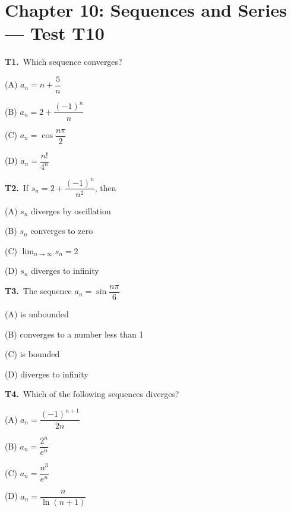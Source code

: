 \documentclass[11pt]{article}
\begin{document}
\section*{Chapter 10: Sequences and Series --- Test T10}

\bigskip\noindent\textbf{T1.}\ Which sequence converges?
\begin{list}{}{\setlength{\leftmargin}{3em}\setlength{\labelwidth}{2.5em}\setlength{\itemsep}{0pt}\setlength{\topsep}{2pt}}
\item[(A)] $a_n = n+\dfrac{5}{n}$
\item[(B)] $a_n = 2+\dfrac{(-1)^n}{n}$
\item[(C)] $a_n = \cos\dfrac{n\pi}{2}$
\item[(D)] $a_n = \dfrac{n!}{4^n}$
\end{list}

\bigskip\noindent\textbf{T2.}\ If $s_n = 2+\dfrac{(-1)^n}{n^2}$, then
\begin{list}{}{\setlength{\leftmargin}{3em}\setlength{\labelwidth}{2.5em}\setlength{\itemsep}{0pt}\setlength{\topsep}{2pt}}
\item[(A)] $s_n$ diverges by oscillation
\item[(B)] $s_n$ converges to zero
\item[(C)] $\displaystyle\lim_{n\to\infty} s_n = 2$
\item[(D)] $s_n$ diverges to infinity
\end{list}

\bigskip\noindent\textbf{T3.}\ The sequence $a_n = \sin\dfrac{n\pi}{6}$
\begin{list}{}{\setlength{\leftmargin}{3em}\setlength{\labelwidth}{2.5em}\setlength{\itemsep}{0pt}\setlength{\topsep}{2pt}}
\item[(A)] is unbounded
\item[(B)] converges to a number less than 1
\item[(C)] is bounded
\item[(D)] diverges to infinity
\end{list}

\bigskip\noindent\textbf{T4.}\ Which of the following sequences diverges?
\begin{list}{}{\setlength{\leftmargin}{3em}\setlength{\labelwidth}{2.5em}\setlength{\itemsep}{0pt}\setlength{\topsep}{2pt}}
\item[(A)] $a_n = \dfrac{(-1)^{n+1}}{2n}$
\item[(B)] $a_n = \dfrac{2^n}{e^n}$
\item[(C)] $a_n = \dfrac{n^3}{e^n}$
\item[(D)] $a_n = \dfrac{n}{\ln(n+1)}$
\end{list}
\end{document}

